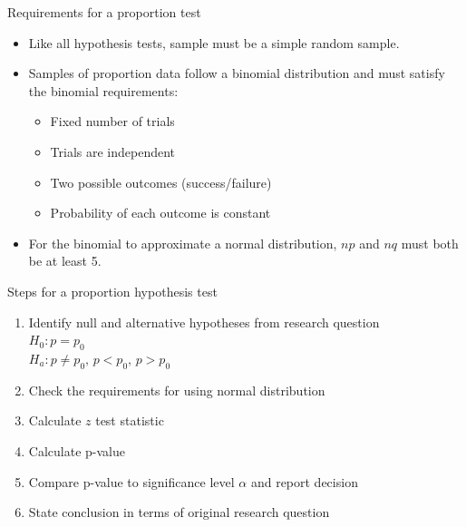 \documentclass[xcolor=table, aspectratio=169, bigger]{beamer}
\begin{document}
\begin{frame}{Requirements for a proportion test}
\begin{block}{}
\begin{itemize}
\item Like all hypothesis tests, sample must be a simple random sample.\\
\item Samples of proportion data follow a binomial distribution and must satisfy the binomial requirements:
\begin{itemize}
\item Fixed number of trials
\item Trials are independent
\item Two possible outcomes (success/failure)
\item Probability of each outcome is constant
\end{itemize}
\item For the binomial to approximate a normal distribution, $np$ and $nq$ must both be at least 5.
\end{itemize}
\end{block}
\end{frame}

\begin{frame}{Steps for a proportion hypothesis test}
\begin{block}{}
\begin{enumerate}
\item Identify null and alternative hypotheses from research question\\
$H_0: p = p_0$\\
$H_a: p \ne p_0, \, p < p_0, \, p> p_0$
\item Check the requirements for using normal distribution
\item Calculate $z$ test statistic
\item Calculate p-value
\item Compare p-value to significance level $\alpha$ and report decision
\item State conclusion in terms of original research question
\end{enumerate}
\end{block}
\end{frame}
\end{document}
